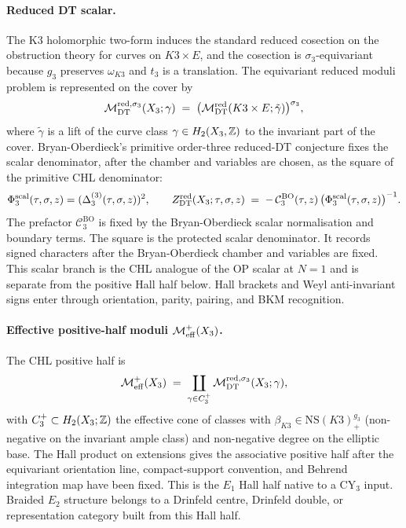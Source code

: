 \paragraph{Reduced DT scalar.} The K3 holomorphic two-form induces the
standard reduced cosection on the obstruction theory for curves on
$K3\times E$, and the cosection is $\sigma_3$-equivariant because
$g_3$ preserves $\omega_{K3}$ and $t_3$ is a translation. The
equivariant reduced moduli problem is represented on the cover by
\[
  \mathcal{M}^{\mathrm{red},\sigma_3}_{\mathrm{DT}}(X_3;\gamma)
  \;=\;
  \bigl(\mathcal{M}^{\mathrm{red}}_{\mathrm{DT}}(K3\times E;\tilde\gamma)\bigr)^{\sigma_3},
\]
where $\tilde\gamma$ is a lift of the curve class
$\gamma\in H_2(X_3,\mathbb{Z})$ to the invariant part of the cover.
Bryan-Oberdieck's primitive order-three reduced-DT conjecture fixes the
scalar denominator, after the chamber and variables are chosen, as the
square of the primitive CHL denominator:
\[
  \Phi^{\mathrm{scal}}_3(\tau,\sigma,z)
  =
  (\Delta_{3}^{(3)}(\tau,\sigma,z))^2,
  \qquad
  Z^{\mathrm{red}}_{\mathrm{DT}}(X_3;\tau,\sigma,z)
  \;=\;
  -\,\mathcal C^{\mathrm{BO}}_3(\tau,z)\,
  \bigl(\Phi^{\mathrm{scal}}_3(\tau,\sigma,z)\bigr)^{-1}.
\]
The prefactor $\mathcal C^{\mathrm{BO}}_3$ is fixed by the
Bryan-Oberdieck scalar normalisation and boundary terms. The square is
the protected scalar denominator. It records signed characters after
the Bryan-Oberdieck chamber and variables are fixed. This scalar branch
is the CHL analogue of the OP scalar at $N=1$ and is separate from the
positive Hall half below. Hall brackets and Weyl anti-invariant signs
enter through orientation, parity, pairing, and BKM recognition.

\paragraph{Effective positive-half moduli $\mathcal{M}^+_{\mathrm{eff}}(X_3)$.} The
CHL positive half is
\[
  \mathcal{M}^+_{\mathrm{eff}}(X_3) \;=\; \coprod_{\gamma\in C^+_3}
  \mathcal{M}^{\mathrm{red},\sigma_3}_{\mathrm{DT}}(X_3;\gamma),
\]
with $C^+_3\subset H_2(X_3;\mathbb{Z})$ the effective cone of classes with
$\beta_{K3}\in\mathrm{NS}(K3)^{g_3}_+$ (non-negative on the invariant
ample class) and non-negative degree on the elliptic base. The Hall
product on extensions gives the associative positive half after the
equivariant orientation line, compact-support convention, and Behrend
integration map have been fixed. This is the $E_1$ Hall half native to a
CY$_3$ input. Braided $E_2$ structure belongs to a Drinfeld centre,
Drinfeld double, or representation category built from this Hall half.

